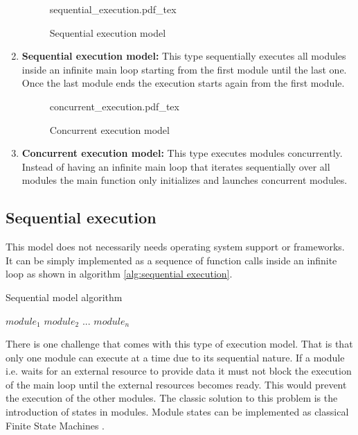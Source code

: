 \begin{enumerate}

\begin{figure}[H]
    \centering
    {sequential_execution.pdf_tex}
    \caption{Sequential execution model}
\end{figure}

    \item \textbf{Sequential execution model:} This type sequentially executes all modules inside an infinite main loop starting from the first module until the last one. Once the last module ends the execution starts again from the first module.

\begin{figure}[H]
\centering
{concurrent_execution.pdf_tex}
\caption{Concurrent execution model}
\end{figure}
    \item \textbf{Concurrent execution model:} This type executes modules concurrently. Instead of having an infinite main loop that iterates sequentially over all modules the main function only initializes and launches concurrent modules.
\end{enumerate}

\subsection{Sequential execution}%
This model does not necessarily needs operating system support or frameworks. It can be simply implemented as a sequence of function calls inside an infinite loop as shown in algorithm \ref{alg:sequential execution}.

\begin{algorithm}[H]
\caption{Sequential model algorithm}
\label{alg:sequential execution}
\begin{algorithmic}
\STATE $module_1$
\STATE $module_2$
\STATE $...$
\STATE $module_n$
\ENDWHILE
\end{algorithmic}
\end{algorithm}

There is one challenge that comes with this type of execution model. That is that only one module can execute at a time due to its sequential nature. If a module i.e. waits for an external resource to provide data it must not block the execution of the main loop until the external resources becomes ready. This would prevent the execution of the other modules. The classic solution to this problem is the introduction of states in modules. Module states can be implemented as classical Finite State Machines \cite{booth}.


